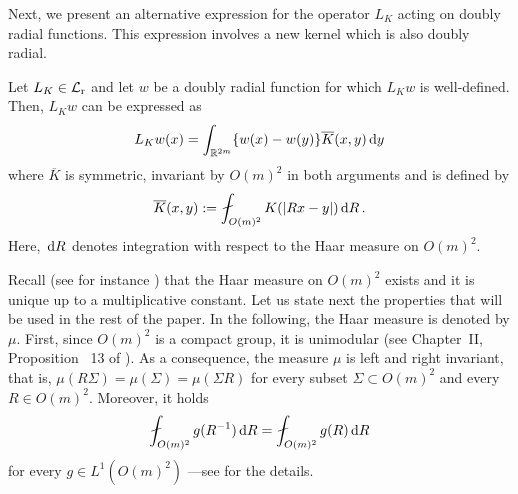 Next, we present an alternative expression for the operator $L_K $ acting on doubly radial functions. This expression involves a new kernel which is also doubly radial.

\begin{lemma} \label{Lemma:AlternativeOperatorExpression}
Let $L_K \in \mathcal{L}_{\mathrm{r}}$ and let $w$ be a doubly radial function for which $L_K w$ is well-defined. Then, $L_K w$ can be expressed as
$$
L_K w(x) = \int_{\mathbb{R}^{2m}} \{w(x) - w(y)\} \overline{K}(x,y) \,\mathrm{d} y
$$
where $\overline{K}$ is symmetric, invariant by $O(m)^2$ in both arguments and is defined by
\begin{equation*}
\overline{K}(x,y) := \average_{O(m)^2} K(|Rx - y|)\d R\,.
\end{equation*}
Here, $\,\mathrm{d} R$ denotes integration with respect to the Haar measure on $O(m)^2$.
\end{lemma}

Recall (see for instance \cite{Nachbin}) that the Haar measure on $O(m)^2$ exists and it is unique up to a
multiplicative constant. Let us state next the properties that will be used in the rest of the
paper. In the following, the Haar measure is denoted by $\mu$. First, since $O(m)^2$ is a compact
group, it is unimodular (see Chapter~II, Proposition~ 13 of \cite{Nachbin}). As a consequence, the
measure $\mu$ is left and right invariant, that is, $\mu(R\Sigma) = \mu(\Sigma) = \mu(\Sigma R) $
for every subset $\Sigma \subset O(m)^2$ and every $R\in O(m)^2$. Moreover, it holds
\begin{equation}
\label{Eq:Unimodular}
\average_{O(m)^2} g(R^{-1}) \d R = \average_{O(m)^2} g(R) \d R
\end{equation}	
for every $g\in L^1(O(m)^2)$ ---see \cite{Nachbin} for the details.

